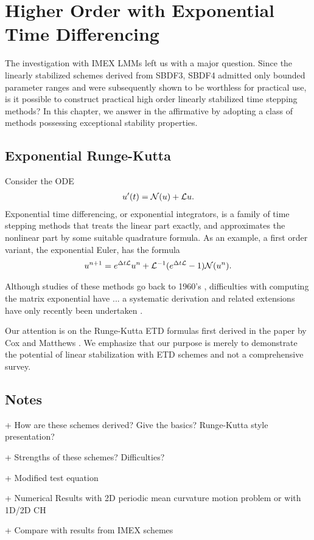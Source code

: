 \chapter{Higher Order with Exponential Time Differencing}
The investigation with IMEX LMMs left us with a major question. Since the linearly stabilized schemes derived from SBDF3, SBDF4 admitted only bounded parameter ranges and were subsequently shown to be worthless for practical use, is it possible to construct practical high order linearly stabilized time stepping methods? In this chapter, we answer in the affirmative by adopting a class of methods possessing  exceptional stability properties. 

\section{Exponential Runge-Kutta}
Consider the ODE
\begin{align}
u'(t) = \mathcal{N}(u) + \mathcal{L} u.
\end{align}
Exponential time differencing, or exponential integrators, is a family of time stepping methods that treats the linear part exactly, and approximates the nonlinear part by some suitable quadrature formula. As an example, a first order variant, the exponential Euler, has the formula
\begin{align}
u^{n+1} 
= e^{\Delta t\mathcal{L}} u^n + \mathcal{L}^{-1}(e^{\Delta t\mathcal{L}}  -1) \mathcal{N}(u^n).
\end{align}

Although studies of these methods go back to 1960's \cite{}, difficulties with computing the matrix exponential have ... a systematic derivation and related extensions have only recently been undertaken \cite{hochbruck2005explicit, hochbruck2005exponential, hochbruck2009exprosenbrock, hochbruck2010expintegrators}.

Our attention is on the Runge-Kutta ETD formulas first derived in the paper by Cox and Matthews \cite{cox2002exponential}. We emphasize that our purpose is merely to demonstrate the potential of linear stabilization with ETD schemes and not a comprehensive survey.

\section{Notes}
+ How are these schemes derived? Give the basics? Runge-Kutta style presentation? 

+ Strengths of these schemes? Difficulties? 

+ Modified test equation

+ Numerical Results with 2D periodic mean curvature motion problem or with 1D/2D CH 

+ Compare with results from IMEX schemes
